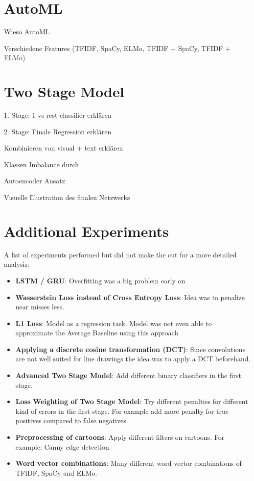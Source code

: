\documentclass[draft,final,oneside]{vutinfth} %
\begin{document}
\section{AutoML}
Wieso AutoML

Verschiedene Features (TFIDF, SpaCy, ELMo, TFIDF + SpaCy, TFIDF + ELMo)

\section{Two Stage Model}

1. Stage: 1 vs rest classifier erklären

2. Stage: Finale Regression erklären

Kombinieren von visual + text erklären

Klassen Imbalance durch 

Autoencoder Ansatz

Visuelle Illustration des finalen Netzwerks

\section{Additional Experiments}
A list of experiments performed but did not make the cut for a more detailed analysis:

\begin{itemize}
\item \textbf{LSTM / GRU}: Overfitting was a big problem early on
\item \textbf{Wasserstein Loss instead of Cross Entropy Loss}: Idea was to penalize near misses less.
\item \textbf{L1 Loss}: Model as a regression task. Model was not even able to approximate the Average Baseline using this approach
\item \textbf{Applying a discrete cosine transformation (DCT)}: Since convolutions are not well suited for line drawings the idea was to apply a DCT beforehand. 
\item \textbf{Advanced Two Stage Model}: Add different binary classifiers in the first stage.
\item \textbf{Loss Weighting of Two Stage Model}: Try different penalties for different kind of errors in the first stage. For example add more penalty for true positives compared to false negatives.
\item \textbf{Preprocessing of cartoons}: Apply different filters on cartoons. For example: Canny edge detection.
\item \textbf{Word vector combinations}: Many different word vector combinations of TFIDF, SpaCy and ELMo. 
\end{itemize}
\end{document}
